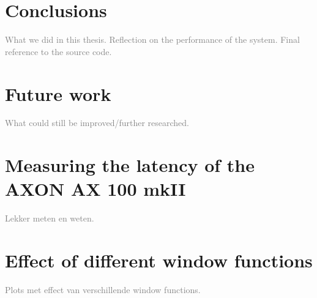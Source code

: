 \documentclass[10pt,twocolumn]{article}
\begin{document}
\section{Conclusions}
\textcolor{gray}{What we did in this thesis. Reflection on the performance of the system. Final reference to the source code.}


\section{Future work}  \label{sec:future}
\textcolor{gray}{What could still be improved/further researched.}



\appendix
\section{Measuring the latency of the AXON AX 100 mkII}  \label{sec:ax100}
\textcolor{gray}{Lekker meten en weten.}

\section{Effect of different window functions}
\textcolor{gray}{Plots met effect van verschillende window functions.}




\end{document}
